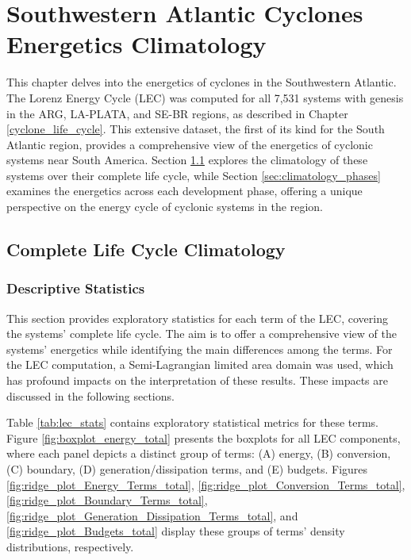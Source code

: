 \chapter{Southwestern Atlantic Cyclones Energetics Climatology} \label{ch:energetics}

This chapter delves into the energetics of cyclones in the Southwestern Atlantic. The Lorenz Energy Cycle (LEC) was computed for all 7,531 systems with genesis in the ARG, LA-PLATA, and SE-BR regions, as described in Chapter \ref{cyclone_life_cycle}. This extensive dataset, the first of its kind for the South Atlantic region, provides a comprehensive view of the energetics of cyclonic systems near South America. Section \ref{sec:climatology} explores the climatology of these systems over their complete life cycle, while Section \ref{sec:climatology_phases} examines the energetics across each development phase, offering a unique perspective on the energy cycle of cyclonic systems in the region.

\section{Complete Life Cycle Climatology}\label{sec:climatology}

\subsection{Descriptive Statistics} \label{sec:statistics_complete}

This section provides exploratory statistics for each term of the LEC, covering the systems' complete life cycle. The aim is to offer a comprehensive view of the systems' energetics while identifying the main differences among the terms. For the LEC computation, a Semi-Lagrangian limited area domain was used, which has profound impacts on the interpretation of these results. These impacts are discussed in the following sections.

Table \ref{tab:lec_stats} contains exploratory statistical metrics for these terms. Figure \ref{fig:boxplot_energy_total} presents the boxplots for all LEC components, where each panel depicts a distinct group of terms: (A) energy, (B) conversion, (C) boundary, (D) generation/dissipation terms, and (E) budgets. Figures \ref{fig:ridge_plot_Energy_Terms_total}, \ref{fig:ridge_plot_Conversion_Terms_total}, \ref{fig:ridge_plot_Boundary_Terms_total}, \ref{fig:ridge_plot_Generation_Dissipation_Terms_total}, and \ref{fig:ridge_plot_Budgets_total} display these groups of terms' density distributions, respectively.

